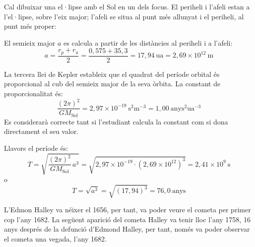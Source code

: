 \begin{solapartat}
 Cal dibuixar una el·lipse amb el Sol en un dels focus. El periheli i l'afeli estan a l'el·lipse, sobre l'eix major; l'afeli se situa al punt més allunyat i el periheli, al punt més proper:

 El semieix major $a$ es calcula a partir de les distàncies al periheli i a l'afeli:
\[ a = \frac{r_p + r_a}{2} = \frac{0,575 + 35,3}{2} = 17,94\ \mathrm{ua} = 2,69\times 10^{12}\ \mathrm{m} \]

 La tercera llei de Kepler estableix que el quadrat del període orbital és proporcional al cub del semieix major de la seva òrbita. La constant de proporcionalitat és:
\[ \frac{(2\pi)^2}{G M_\mathrm{Sol}} = 2,97\times 10^{-19}\ \mathrm{s^2 m^{-3}} = 1,00\ \mathrm{anys^2 ua^{-3}} \]
Es considerarà correcte tant si l'estudiant calcula la constant com si dona directament el seu valor.

Llavors el període és:
\[ T = \sqrt{\frac{(2\pi)^2}{G M_\mathrm{Sol}}\,a^3} = \sqrt{2,97\times 10^{-19}\cdot (2,69\times 10^{12})^3} = 2,41\times 10^{9}\ \mathrm{s} \]
o
\[ T = \sqrt{a^3} = \sqrt{(17,94)^3} = 76,0\ \mathrm{anys} \]

 L'Edmon Halley va néixer el 1656, per tant, va poder veure el cometa per primer cop l'any 1682. La següent aparició del cometa Halley va tenir lloc l'any 1758, 16 anys després de la defunció d'Edmond Halley, per tant, només va poder observar el cometa una vegada, l'any 1682.
\end{solapartat}

